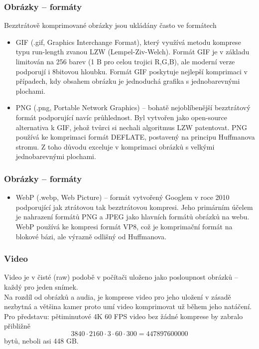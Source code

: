 \documentclass[aspectratio=169,11pt,svgnames]{beamer}
\begin{document}
\begin{frame}
 \frametitle{Obrázky -- formáty}
 Bezztrátově komprimované obrázky jsou ukládány často ve formátech
 \begin{itemize}[label=\textbullet]
  \item \alert{GIF} (.gif, Graphics Interchange Format), který využívá metodu
   komprese typu run-length zvanou LZW (Lempel-Ziv-Welch). Formát GIF je v
   základu limitován na 256 barev (1 B pro celou trojici R,G,B), ale moderní
   verze podporují i 8bitovou hloubku. Formát GIF poskytuje nejlepší komprimaci
   v případech, kdy obsahem obrázku je jednoduchá grafika s jednobarevnými
   plochami.
  \pause
  \item \alert{PNG} (.png, Portable Network Graphics) -- bohatě nejoblíbenější
   bezztrátový formát podporující navíc \alert{průhlednost}. Byl vytvořen jako
   open-source alternativa k GIF, jehož tvůrci si nechali algoritmus LZW
   patentovat. PNG používá ke komprimaci formát DEFLATE, postavený na principu
   Huffmanova stromu. Z toho důvodu exceluje v komprimaci obrázků s velkými
   jednobarevnými plochami.
 \end{itemize}
\end{frame}

\begin{frame}
 \frametitle{Obrázky -- formáty}
 \begin{itemize}[label=\textbullet]
  \item \alert{WebP} (.webp, Web Picture) -- formát vytvořený Googlem v roce
   2010 podporující jak ztrátovou tak bezztrátovou kompresi. Jeho primárním
   účelem je nahrazení formátů PNG a JPEG jako hlavních formátů obrázků na webu.
   WebP používá ke kompresi formát \alert{VP8}, což je komprimační formát na
   blokové bázi, ale výrazně odlišný od Huffmanova.
 \end{itemize}
\end{frame}

\begin{frame}
 \frametitle{Video}
 Video je v čisté (raw) podobě v počítači uloženo jako posloupnost obrázků --
 každý pro jeden snímek.\pause\\
 Na rozdíl od obrázků a audia, je komprese video pro jeho uložení v zásadě
 nezbytná a většina kamer proto umí video komprimovat už během jeho
 natáčení.\pause\\
 Pro představu: pětiminutové 4K 60 FPS video bez žádné komprese by zabralo
 přibližně
 \[
  3840 \cdot 2160 \cdot 3 \cdot 60 \cdot 300 = 447897600000
 \]
 bytů, neboli asi 448 GB.
\end{frame}
\end{document}
